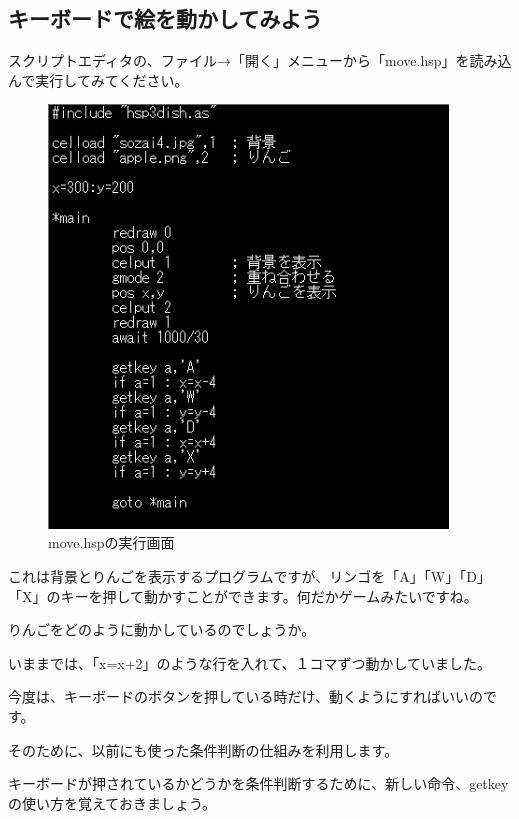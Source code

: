 \newpage
\subsection{キーボードで絵を動かしてみよう}

スクリプトエディタの、ファイル→「開く」メニューから「move.hsp」を読み込んで実行してみてください。


\begin{figure}[H]
    \begin{center}
      \includegraphics[keepaspectratio,width=10.61cm,height=11.229cm]{text04-img/text04-img037.png}
      \caption{move.hspの実行画面}
    \end{center}
    \label{fig:prog_menu}
\end{figure}

これは背景とりんごを表示するプログラムですが、リンゴを「A」「W」「D」「X」のキーを押して動かすことができます。何だかゲームみたいですね。

りんごをどのように動かしているのでしょうか。

いままでは、「x=x+2」のような行を入れて、１コマずつ動かしていました。

今度は、キーボードのボタンを押している時だけ、動くようにすればいいのです。

そのために、以前にも使った条件判断の仕組みを利用します。

キーボードが押されているかどうかを条件判断するために、新しい命令、getkeyの使い方を覚えておきましょう。

\begin{description}
    \item {}
\end{description}

